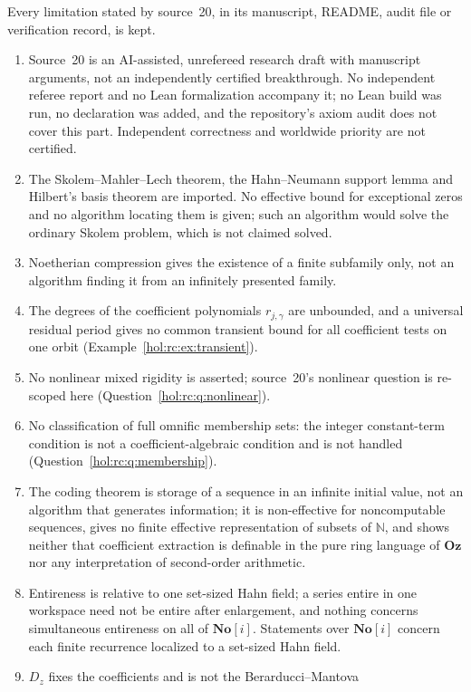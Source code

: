 \documentclass[11pt]{article}
\numberwithin{equation}{section}
\theoremstyle{definition}
\theoremstyle{remark}
\newcommand{\N}{\mathbb N}
\newcommand{\No}{\mathbf{No}}
\newcommand{\Oz}{\mathbf{Oz}}
\begin{document}
Every limitation stated by source~20, in its manuscript, README, audit file or
verification record, is kept.
\begin{enumerate}[label=\textup{(V\arabic*)}]
\item Source~20 is an AI-assisted, unrefereed research draft with manuscript
arguments, not an independently certified breakthrough. No independent
referee report and no Lean formalization accompany it; no Lean build was run,
no declaration was added, and the repository's axiom audit does not cover
this part. Independent correctness and worldwide priority are not certified.
\item The Skolem--Mahler--Lech theorem, the Hahn--Neumann support lemma and
Hilbert's basis theorem are imported. No effective bound for exceptional
zeros and no algorithm locating them is given; such an algorithm would solve
the ordinary Skolem problem, which is not claimed solved.
\item Noetherian compression gives the existence of a finite subfamily only,
not an algorithm finding it from an infinitely presented family.
\item The degrees of the coefficient polynomials $r_{j,\gamma}$ are unbounded,
and a universal residual period gives no common transient bound for all
coefficient tests on one orbit (Example~\ref{hol:rc:ex:transient}).
\item No nonlinear mixed rigidity is asserted; source~20's nonlinear question
is re-scoped here (Question~\ref{hol:rc:q:nonlinear}).
\item No classification of full omnific membership sets: the integer
constant-term condition is not a coefficient-algebraic condition and is not
handled (Question~\ref{hol:rc:q:membership}).
\item The coding theorem is storage of a sequence in an infinite initial
value, not an algorithm that generates information; it is non-effective for
noncomputable sequences, gives no finite effective representation of subsets
of $\N$, and shows neither that coefficient extraction is definable in the pure
ring language of $\Oz$ nor any interpretation of second-order arithmetic.
\item Entireness is relative to one set-sized Hahn field; a series entire in
one workspace need not be entire after enlargement, and nothing concerns
simultaneous entireness on all of $\No[i]$. Statements over $\No[i]$ concern
each finite recurrence localized to a set-sized Hahn field.
\item $D_z$ fixes the coefficients and is not the Berarducci--Mantova

\end{enumerate}
\end{document}
